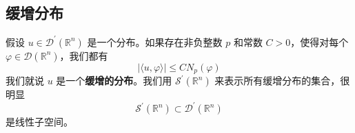 \subsection{缓增分布}

\begin{definition}[缓增的分布]
假设 $u \in \mathcal{D}^{\prime}\left(\mathbb{R}^n\right)$ 是一个分布。如果存在非负整数 $p$ 和常数 $C>0$，使得对每个 $\varphi \in \mathcal{D}\left(\mathbb{R}^n\right)$，我们都有
\[
|\langle u, \varphi\rangle| \leqslant C N_p(\varphi)
\]我们就说 $u$ 是一个\textbf{缓增的分布}。我们用 $\mathcal{S}^{\prime}\left(\mathbb{R}^n\right)$ 来表示所有缓增分布的集合，很明显
\[
\mathcal{S}^{\prime}\left(\mathbb{R}^n\right) \subset \mathcal{D}^{\prime}\left(\mathbb{R}^n\right)
\]是线性子空间。
\end{definition}